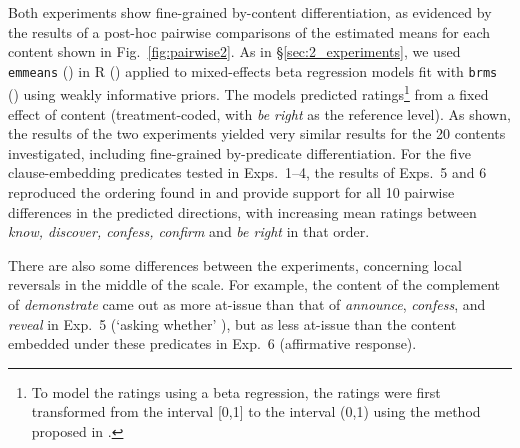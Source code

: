 \documentclass[times,linguex]{glossa}
\begin{document}
Both experiments show fine-grained by-content differentiation, as evidenced by the results of a post-hoc pairwise comparisons of the estimated means for each content shown in Fig.~\ref{fig:pairwise2}. As in \S\ref{sec:2_experiments}, we used \texttt{emmeans} (\citealt{emmeans}) in R (\citealt{r}) applied to mixed-effects beta regression models fit with \texttt{brms} (\citealt{buerkner2017}) using weakly informative priors. The models predicted ratings\footnote{To model the ratings using a beta regression, the ratings were first transformed from the interval [0,1] to the interval (0,1) using the method proposed in \citealt{smithson-verkuilen2006}.} from a fixed effect of content (treatment-coded, with \emph{be right} as the reference level). As shown, the results of the two experiments yielded very similar results for the 20 contents investigated, including fine-grained by-predicate differentiation. For the five clause-embedding predicates tested in Exps.~1--4, the results of Exps.~5 and 6 reproduced the ordering found in \citet{degen_projection_2025} and provide support for all 10 pairwise differences in the predicted directions, with increasing mean ratings between \emph{know, discover, confess, confirm} and \emph{be right} in that order. 

There are also some differences between the experiments, concerning local reversals in the middle of the scale. For example, the content of the complement of \emph{demonstrate} came out as more at-issue than that of \emph{announce}, \emph{confess}, and \emph{reveal} in Exp.~5 (`asking whether' ), but as less at-issue than the content embedded under these predicates in Exp.~6 (affirmative response). 





\end{document}
